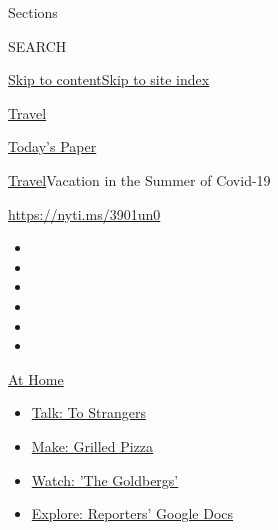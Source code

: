 Sections

SEARCH

\protect\hyperlink{site-content}{Skip to
content}\protect\hyperlink{site-index}{Skip to site index}

\href{https://www.nytimes3xbfgragh.onion/section/travel}{Travel}

\href{https://myaccount.nytimes3xbfgragh.onion/auth/login?response_type=cookie\&client_id=vi}{}

\href{https://www.nytimes3xbfgragh.onion/section/todayspaper}{Today's
Paper}

\href{/section/travel}{Travel}\textbar{}Vacation in the Summer of
Covid-19

\url{https://nyti.ms/3901un0}

\begin{itemize}
\item
\item
\item
\item
\item
\item
\end{itemize}

\href{https://www.nytimes3xbfgragh.onion/spotlight/at-home?action=click\&pgtype=Article\&state=default\&region=TOP_BANNER\&context=at_home_menu}{At
Home}

\begin{itemize}
\tightlist
\item
  \href{https://www.nytimes3xbfgragh.onion/2020/08/03/well/family/the-benefits-of-talking-to-strangers.html?action=click\&pgtype=Article\&state=default\&region=TOP_BANNER\&context=at_home_menu}{Talk:
  To Strangers}
\item
  \href{https://www.nytimes3xbfgragh.onion/2020/08/01/at-home/coronavirus-make-pizza-on-a-grill.html?action=click\&pgtype=Article\&state=default\&region=TOP_BANNER\&context=at_home_menu}{Make:
  Grilled Pizza}
\item
  \href{https://www.nytimes3xbfgragh.onion/2020/07/31/arts/television/goldbergs-abc-stream.html?action=click\&pgtype=Article\&state=default\&region=TOP_BANNER\&context=at_home_menu}{Watch:
  'The Goldbergs'}
\item
  \href{https://www.nytimes3xbfgragh.onion/interactive/2020/at-home/even-more-reporters-editors-diaries-lists-recommendations.html?action=click\&pgtype=Article\&state=default\&region=TOP_BANNER\&context=at_home_menu}{Explore:
  Reporters' Google Docs}
\end{itemize}

